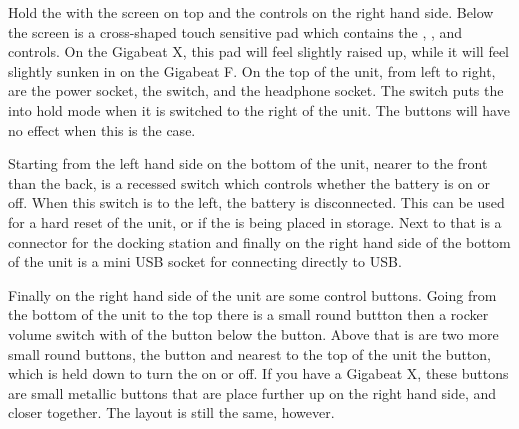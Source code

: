 {{  Hold the \dap{} with the screen on top and the controls on the right hand side.
  Below the screen is a cross-shaped touch sensitive pad which contains the
  \ButtonUp{}, \ButtonDown{}, \ButtonLeft{} and \ButtonRight{} controls.  On the
  Gigabeat X, this pad will feel slightly raised up, while it will feel slightly
  sunken in on the Gigabeat F. On the top of the unit, from left to right, are the
  power socket, the \ButtonHold{} switch, and the headphone socket.  The
  \ButtonHold{} switch puts the \dap{} into hold mode when it is switched to the
  right of the unit. The buttons will have no effect when this is the case.

  Starting from the left hand side on the bottom of the unit, nearer to the front
  than the back, is a recessed switch which
  controls whether the battery is on or off.  When this switch is to the left,
  the battery is disconnected.  This can be used for a hard reset of the unit,
  or if the \dap{} is being placed in storage.  Next to that is a connector for
  the docking station and finally on the right hand side of the bottom of the
  unit is a mini USB socket for connecting directly to USB.

  Finally on the right hand side of the unit are some control buttons.  Going from
  the bottom of the unit to the top there is a small round \ButtonA{} buttton then a
  rocker volume switch with of the \ButtonVolDown{} button below the \ButtonVolUp{}
  button.  Above that is are two more small round buttons, the \ButtonMenu{}
  button and nearest to the top of the unit the \ButtonPower{} button, which is held
  down to turn the \dap{} on or off. If you have a Gigabeat X, these buttons are small
  metallic buttons that are place further up on the right hand side, and closer
  together. The layout is still the same, however.}
  }
